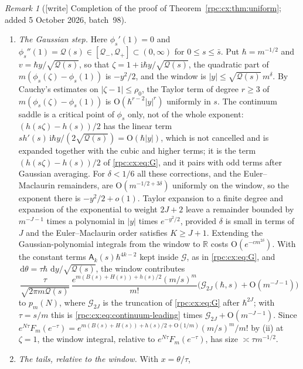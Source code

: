 \documentclass[11pt]{article}
\theoremstyle{definition}
\theoremstyle{remark}
\newtheorem{remark}[theorem]{Remark}
\newcommand{\ii}{\mathrm i}
\newcommand{\dd}{\,\mathrm d}
\numberwithin{equation}{section}
\begin{document}
\begin{remark}[\textsf{[write]} Completion of the proof of Theorem~\ref{rpc:cx:thm:uniform}; added 5 October 2026, batch~98]
\begin{enumerate}[label=(\roman*)]
 $f(0)=0$, the odd derivatives of $f$ vanish at $x=0$ because $h$ is even,
 $f^{(2k-1)}(m)=(s\zeta/m)^{2k-1}h^{(2k-1)}(s\zeta)$, and the remainder
 integral is bounded by $m\sup|f^{(2K)}|$ times a constant depending on~$K$.
\item \emph{The Gaussian step.} Here $\phi_s'(1)=0$ and
 $\phi_s''(1)=\mathcal Q(s)\in[\mathcal Q_-,\mathcal Q_+]\subset(0,\infty)$
 for $0\le s\le\bar s$. Put $\hbar=m^{-1/2}$ and $v=\hbar y/\sqrt{\mathcal Q(s)}$,
 so that $\zeta=1+\ii\hbar y/\sqrt{\mathcal Q(s)}$, the quadratic part of
 $m(\phi_s(\zeta)-\phi_s(1))$ is $-y^2/2$, and the window is
 $|y|\le\sqrt{\mathcal Q(s)}\,m^{\delta}$. By Cauchy's estimates on
 $|\zeta-1|\le\rho_0$, the Taylor term of degree $r\ge3$ of
 $m(\phi_s(\zeta)-\phi_s(1))$ is $\mathrm O(\hbar^{r-2}|y|^r)$ uniformly in $s$.
 The continuum saddle is a critical point of $\phi_s$ only, not of the whole
 exponent: $(h(s\zeta)-h(s))/2$ has the linear term
 $sh'(s)\,\ii\hbar y/(2\sqrt{\mathcal Q(s)})=\mathrm O(\hbar|y|)$, which is not
 cancelled and is expanded together with the cubic and higher terms; it is the
 term $(h(s\zeta)-h(s))/2$ of \eqref{rpc:cx:eq:G}, and it pairs with odd
 terms after Gaussian averaging. For $\delta<1/6$ all these corrections,
 and the Euler--Maclaurin remainders, are $\mathrm O(m^{-1/2+3\delta})$
 uniformly on the window, so the exponent there is $-y^2/2+o(1)$. Taylor
 expansion to a finite degree and expansion of the exponential to weight
 $2J+2$ leave a remainder bounded by $m^{-J-1}$ times a polynomial in $|y|$
 times $e^{-y^2/2}$, provided $\delta$ is small in terms of $J$ and the
 Euler--Maclaurin order satisfies $K\ge J+1$. Extending the
 Gaussian-polynomial integrals from the window to $\mathbb R$ costs
 $\mathrm O(e^{-cm^{2\delta}})$. With the constant terms
 $\mathsf A_k(s)\hbar^{4k-2}$ kept inside $\mathcal G$, as in
 \eqref{rpc:cx:eq:G}, and $\dd\theta=\tau\hbar\,\dd y/\sqrt{\mathcal Q(s)}$,
 the window contributes
 \[
  \frac{\tau}{\sqrt{2\pi m\mathcal Q(s)}}\,
  \frac{e^{m(B(s)+H(s))+h(s)/2}(m/s)^m}{m!}
  \bigl(\mathcal G_{2J}(\hbar,s)+\mathrm O(m^{-J-1})\bigr)
 \]
 to $p_m(N)$, where $\mathcal G_{2J}$ is the truncation of
 \eqref{rpc:cx:eq:G} after $\hbar^{2J}$; with $\tau=s/m$ this is
 \eqref{rpc:cx:eq:continuum-leading} times
 $\mathcal G_{2J}+\mathrm O(m^{-J-1})$. Since
 $e^{N\tau}F_m(e^{-\tau})=e^{m(B(s)+H(s))+h(s)/2+\mathrm O(1/m)}(m/s)^m/m!$
 by (ii) at $\zeta=1$, the window integral, relative to
 $e^{N\tau}F_m(e^{-\tau})$, has size $\asymp\tau m^{-1/2}$.
\item \emph{The tails, relative to the window.} With $x=\theta/\tau$,

\end{enumerate}
\end{remark}
\end{document}
